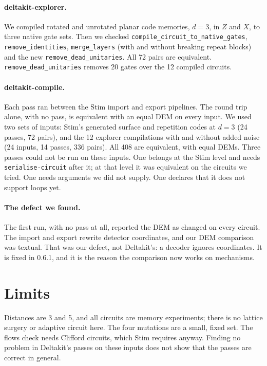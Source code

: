 \documentclass[10pt]{article}
\begin{document}
\paragraph{deltakit-explorer.} We compiled rotated and unrotated planar code
memories, $d=3$, in $Z$ and $X$, to three native gate sets. Then we checked
\texttt{compile\_circuit\_to\_native\_gates}, \texttt{remove\_identities},
\texttt{merge\_layers} (with and without breaking repeat blocks) and the new
\texttt{remove\_dead\_unitaries}. All 72 pairs are equivalent.
\texttt{remove\_dead\_unitaries} removes 20 gates over the 12 compiled circuits.

\paragraph{deltakit-compile.} Each pass ran between the Stim import and export
pipelines. The round trip alone, with no pass, is equivalent with an equal DEM
on every input. We used two sets of inputs: Stim's generated surface and
repetition codes at $d=3$ (24 passes, 72 pairs), and the 12 explorer
compilations with and without added noise (24 inputs, 14 passes, 336 pairs).
All 408 are equivalent, with equal DEMs. Three passes could not be
run on these inputs. One belongs at the Stim level and needs
\texttt{serialise-circuit} after it; at that level it was equivalent on the circuits we tried. One needs
arguments we did not supply. One declares that it does not support loops yet.

\paragraph{The defect we found.} The first run, with no pass at all, reported
the DEM as changed on every circuit. The import and export rewrite detector
coordinates, and our DEM comparison was textual. That was our defect, not
Deltakit's: a decoder ignores coordinates. It is fixed in 0.6.1, and it is the
reason the comparison now works on mechanisms.

\section{Limits}

Distances are 3 and 5, and all circuits are memory experiments; there is no
lattice surgery or adaptive circuit here. The four mutations are a small, fixed
set. The flows check needs Clifford circuits, which Stim requires anyway.
Finding no problem in Deltakit's passes on these inputs does not show that the
passes are correct in general.
\end{document}
